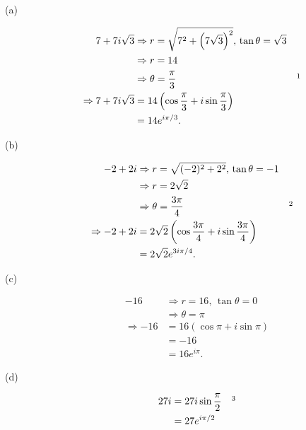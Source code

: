 \documentclass{tufte-handout}
\begin{document}
\begin{description}
\item[\textup{(a)}]
  \begin{align*}
    7 + 7i\sqrt{3} &\Rightarrow r=\sqrt{7^2 +
                     {\left(7\sqrt{3}\right)}^2}, \, \tan\theta =
                     \sqrt{3}\\
                   &\Rightarrow r = 14\\
                   &\Rightarrow \theta = {\pi \over 3} && \footnotemark\\
    \Rightarrow 7 + 7i\sqrt{3} &= 14\left(\cos{\pi \over 3} +
                                 i\sin{\pi \over 3}\right)\\
                                 &= 14e^{i\pi / 3}.
  \end{align*}

\item[\textup{(b)}]
  \begin{align*}
    -2 + 2i &\Rightarrow r = \sqrt{(-2)^2 + 2^2}, \, \tan \theta =
              -1\\
            &\Rightarrow r = 2 \sqrt 2\\
            &\Rightarrow \theta = {3\pi \over 4} && \footnotemark\\
    \Rightarrow -2 + 2i &= 2\sqrt2 \left(\cos{3\pi \over 4} +
                          i\sin{3\pi \over 4}\right)\\
            &= 2\sqrt2 e^{3i\pi / 4}.
  \end{align*}

\item[\textup{(c)}]
  \begin{align*}
    -16 &\Rightarrow r = 16, \, \tan \theta = 0\\
        &\Rightarrow \theta = \pi\\
    \Rightarrow -16 &= 16(\cos \pi + i\sin \pi)\\
        &= -16\\
        &= 16e^{i\pi}.
  \end{align*}

\item[\textup{(d)}]
  \begin{align*}
    27i &= 27i \sin {\pi \over 2} && \footnotemark\\
        &= 27e^{i\pi / 2}
  \end{align*}
\end{description}
\end{document}
